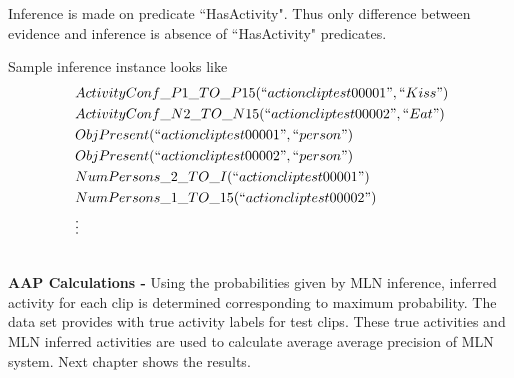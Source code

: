 Inference is made on predicate ``HasActivity". Thus only difference
between evidence and inference is absence of ``HasActivity" predicates.

Sample inference instance looks like
\begin{equation}
	\begin{split}
		~ & ActivityConf\_P1\_TO\_P15(``actioncliptest00001",``Kiss") \\
		~ & ActivityConf\_N2\_TO\_N15(``actioncliptest00002",``Eat") \\
		~ & ObjPresent(``actioncliptest00001",``person") \\
		~ & ObjPresent(``actioncliptest00002",``person") \\
		~ & NumPersons\_2\_TO\_I(``actioncliptest00001") \\
		~ & NumPersons\_1\_TO\_15(``actioncliptest00002") \\
		~ & \vdots
	\end{split}
\end{equation}

~ \\
{\bf AAP Calculations - }Using the probabilities given by MLN inference, inferred activity for each
clip is determined corresponding to maximum probability. The data set provides with true activity labels for test clips. 
These true activities and MLN inferred activities are used to calculate average average precision
of MLN system. Next chapter shows the results.

